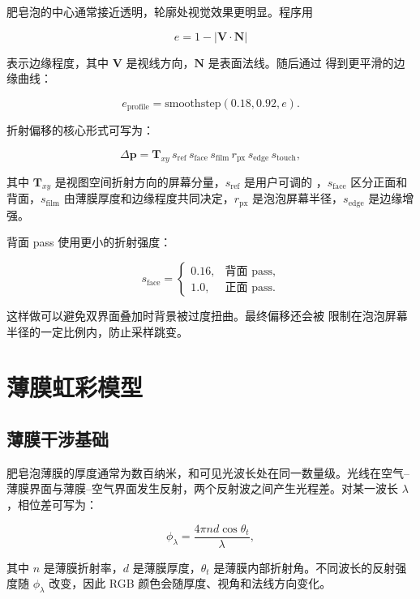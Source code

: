 肥皂泡的中心通常接近透明，轮廓处视觉效果更明显。程序用

\[
e = 1 - |\mathbf{V}\cdot\mathbf{N}|
\]

表示边缘程度，其中 $\mathbf{V}$ 是视线方向，$\mathbf{N}$ 是表面法线。随后通过  得到更平滑的边缘曲线：

\[
e_{\mathrm{profile}} = \mathrm{smoothstep}(0.18, 0.92, e).
\]

折射偏移的核心形式可写为：

\[
\Delta \mathbf{p}
= \mathbf{T}_{xy}\,
s_{\mathrm{ref}}\,
s_{\mathrm{face}}\,
s_{\mathrm{film}}\,
r_{\mathrm{px}}\,
s_{\mathrm{edge}}\,
s_{\mathrm{touch}},
\]

其中 $\mathbf{T}_{xy}$ 是视图空间折射方向的屏幕分量，$s_{\mathrm{ref}}$ 是用户可调的 ，$s_{\mathrm{face}}$ 区分正面和背面，$s_{\mathrm{film}}$ 由薄膜厚度和边缘程度共同决定，$r_{\mathrm{px}}$ 是泡泡屏幕半径，$s_{\mathrm{edge}}$ 是边缘增强。

背面 pass 使用更小的折射强度：

\[
s_{\mathrm{face}} =
\begin{cases}
0.16, & \text{背面 pass},\\
1.0, & \text{正面 pass}.
\end{cases}
\]

这样做可以避免双界面叠加时背景被过度扭曲。最终偏移还会被  限制在泡泡屏幕半径的一定比例内，防止采样跳变。


\section{薄膜虹彩模型}

\subsection{薄膜干涉基础}

肥皂泡薄膜的厚度通常为数百纳米，和可见光波长处在同一数量级。光线在空气--薄膜界面与薄膜--空气界面发生反射，两个反射波之间产生光程差。对某一波长 $\lambda$，相位差可写为：

\[
\phi_\lambda =
\frac{4\pi n d \cos\theta_t}{\lambda},
\]

其中 $n$ 是薄膜折射率，$d$ 是薄膜厚度，$\theta_t$ 是薄膜内部折射角。不同波长的反射强度随 $\phi_\lambda$ 改变，因此 RGB 颜色会随厚度、视角和法线方向变化。

